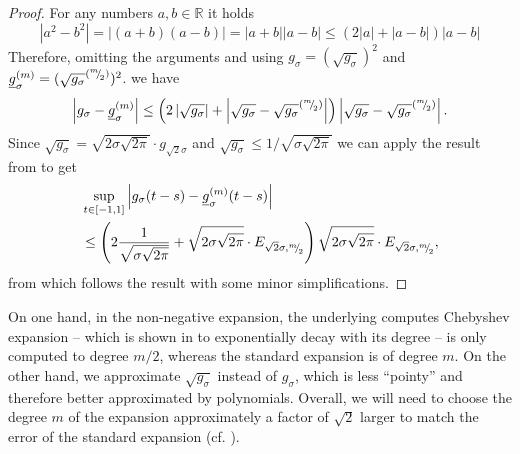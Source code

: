 \documentclass[12pt]{article}
\begin{document}
\begin{proof}
    For any numbers $a, b \in \mathbb{R}$ it holds
    \begin{equation}
    | a^2 - b^2 | = | (a + b)(a - b) | = | a + b | | a - b | \leq (2 | a | + | a - b |)  | a - b |
    \end{equation}
    Therefore, omitting the arguments and using $g_{\sigma} = (\sqrt{g_{\sigma}})^2$ and $\underline{g}_{\sigma}^{(m)} = (\sqrt{g_{\sigma}}^{({}^{m}{\mskip -5mu/\mskip -3mu}_{2})})^2$.
    we have
    \begin{equation}
        \left| g_{\sigma} - \underline{g}_{\sigma}^{(m)} \right| \leq \left( 2 \left| \sqrt{g_{\sigma}} \right| + \left| \sqrt{g_{\sigma}} - \sqrt{g_{\sigma}}^{({}^{m}{\mskip -5mu/\mskip -3mu}_{2})} \right| \right) \left| \sqrt{g_{\sigma}} - \sqrt{g_{\sigma}}^{({}^{m}{\mskip -5mu/\mskip -3mu}_{2})} \right|.
    \end{equation}
    Since $\sqrt{g_{\sigma}} = \sqrt{2 \sigma \sqrt{2 \pi}} \cdot g_{\sqrt{2}\sigma}$ and $\sqrt{g_{\sigma}} \leq 1/\sqrt{\sigma \sqrt{2 \pi}}$ we can apply the result from  to get
    \begin{align}
        &\sup_{t \in [-1, 1]} \left| g_{\sigma}(t - s) - \underline{g}_{\sigma}^{(m)}(t - s) \right| \notag \\
        &\leq \left( 2 \frac{1}{\sqrt{ \sigma \sqrt{2\pi}}} + \sqrt{2 \sigma \sqrt{2 \pi}} \cdot E_{\sqrt{2}\sigma, {}^{m}{\mskip -5mu/\mskip -3mu}_{2}}\right)\sqrt{2 \sigma \sqrt{2 \pi}} \cdot E_{\sqrt{2}\sigma, {}^{m}{\mskip -5mu/\mskip -3mu}_{2}},
    \end{align}
    from which follows the result with some minor simplifications.

\end{proof}

On one hand, in the non-negative expansion, the underlying computes Chebyshev expansion -- which is shown in  to exponentially decay with its degree -- is only computed to degree $m/2$, whereas the standard expansion is of degree $m$. On the other hand, we approximate $\sqrt{g_{\sigma}}$ instead of $g_{\sigma}$, which is less \enquote{pointy} and therefore better approximated by polynomials. Overall, we will need to choose the degree $m$ of the expansion approximately a factor of $\sqrt{2}$ larger to match the error of the standard expansion (cf. ).
\end{document}
